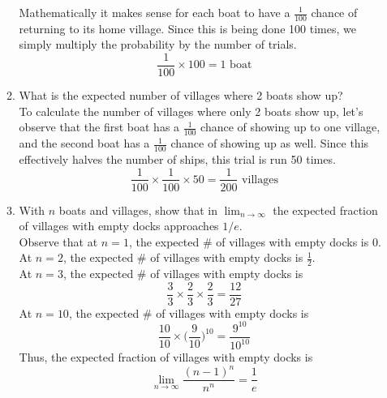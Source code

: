 \documentclass{article}
\begin{document}
\begin{enumerate}
\begin{enumerate}[label=\arabic*.]
                    Mathematically it makes sense for each boat to have a \(\frac{1}{100}\) chance of returning to its home village. Since this is being done 100 times, we simply multiply the probability by the number of trials.
                    \begin{equation*}
                        \frac{1}{100} \times 100 = 1 \text{ boat}
                    \end{equation*}
              \item What is the expected number of villages where 2 boats show up? \\
                    To calculate the number of villages where only 2 boats show up, let's observe that the first boat has a \(\frac{1}{100}\) chance of showing up to one village, and the second boat has a \(\frac{1}{100}\) chance of showing up as well.
                    Since this effectively halves the number of ships, this trial is run 50 times.
                    \begin{equation*}
                        \frac{1}{100} \times \frac{1}{100} \times 50 = \frac{1}{200} \text{ villages}
                    \end{equation*}
              \item With \(n\) boats and villages, show that in \(\lim_{n \to \infty}\) the expected fraction of villages with empty docks approaches \(1 / e\). \\
                    Observe that at \(n = 1\), the expected \# of villages with empty docks is 0. \\
                    At \(n = 2\), the expected \# of villages with empty docks is \(\frac{1}{2}\). \\
                    At \(n = 3\), the expected \# of villages with empty docks is
                    \begin{equation*}
                        \frac{3}{3} \times \frac{2}{3} \times \frac{2}{3} = \frac{12}{27}
                    \end{equation*}
                    At \(n = 10\), the expected \# of villages with empty docks is
                    \begin{equation*}
                        \frac{10}{10} \times \biggl(\frac{9}{10}\biggr)^{10} = \frac{9^{10}}{10^{10}}
                    \end{equation*}
                    Thus, the expected fraction of villages with empty docks is
                    \begin{equation*}
                        \lim_{n \to \infty} \frac{(n - 1)^n}{n^n} = \frac{1}{e}

\end{equation*}
\end{enumerate}
\end{enumerate}
\end{document}
